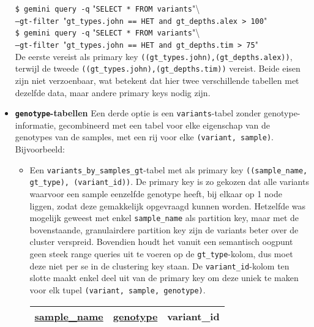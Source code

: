 \begin{itemize}
\noindent\texttt{\$ gemini query -q} "\texttt{SELECT * FROM variants}"\textbackslash \\\texttt{--gt-filter }"\texttt{gt\_types.john == HET and gt\_depths.alex > 100}"\\

\noindent\texttt{\$ gemini query -q} "\texttt{SELECT * FROM variants}"\textbackslash \\\texttt{--gt-filter }"\texttt{gt\_types.john == HET and gt\_depths.tim > 75}"\\

De eerste vereist als primary key \texttt{((gt\_types.john),(gt\_depths.alex))}, terwijl de tweede \texttt{((gt\_types.john),(gt\_depths.tim))} vereist. Beide eisen zijn niet verzoenbaar, wat betekent dat hier twee verschillende tabellen met dezelfde data, maar andere primary keys nodig zijn.

\item \textbf{\texttt{genotype}-tabellen} Een derde optie is een \texttt{variants}-tabel zonder genotype-informatie, gecombineerd met een tabel voor elke eigenschap van de genotypes van de samples, met een rij voor elke \texttt{(variant, sample)}. Bijvoorbeeld:\\

\begin{itemize}

\item Een \texttt{variants\_by\_samples\_gt}-tabel met als primary key \texttt{((sample\_name, gt\_type), (variant\_id))}. De primary key is zo gekozen dat alle variants waarvoor een sample eenzelfde genotype heeft, bij elkaar op 1 node liggen, zodat deze gemakkelijk opgevraagd kunnen worden. Hetzelfde was mogelijk geweest met enkel \texttt{sample\_name} als partition key, maar met de bovenstaande, granulairdere partition key zijn de variants beter over de cluster verspreid. Bovendien houdt het vanuit een semantisch oogpunt geen steek range queries uit te voeren op de \texttt{gt\_type}-kolom, dus moet deze niet per se in de clustering key staan. De \texttt{variant\_id}-kolom ten slotte maakt enkel deel uit van de primary key om deze uniek te maken voor elk tupel \texttt{(variant, sample, genotype)}.\\

\begin{table}[!htbp]
\centering
\begin{tabular}{@{}|l|l|l|@{}}
\toprule
\color{ForestGreen} \underline{sample\_name} & \color{ForestGreen} \underline{genotype} & \color{red} variant\_id \\ \bottomrule
\end{tabular}\\
\end{table}


\end{itemize}
\end{itemize}
